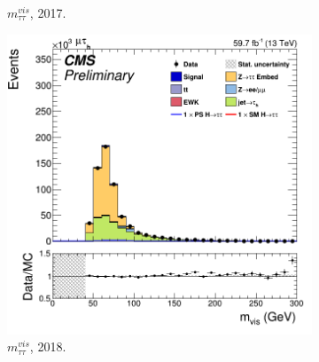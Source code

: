 \begin{figure}
\begin{subfigure}[b]{0.33\linewidth}
    \caption{$m_{\tau\tau}^{vis}$, 2017.} 
    \vspace{0.5ex}
  \end{subfigure} 
    \begin{subfigure}[b]{0.33\linewidth}
    \centering
    \includegraphics[width=\linewidth]{Chapitre7/Images/CtrlPlots/2018/VisibleMass.png} 
    \caption{$m_{\tau\tau}^{vis}$, 2018.} 
    \vspace{0.5ex}
  \end{subfigure} 
  \caption{}
  \label{page1}
\end{figure}

